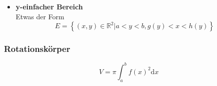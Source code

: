 \documentclass[8pt, a4paper, landscape, fleqn]{scrartcl}
\newenvironment {annotation}[1]
				{\begin{itshape} \begin{small} \textbf{#1} \begin{itemize}}
				{\end{itemize} \end{small} \end{itshape}}
\begin{document}
\begin{multicols*}{3}
\begin{itemize}
						\item \textbf{y-einfacher Bereich}
						\vspace{6pt}\\
						\vspace{-6pt}
						Etwas der Form
					    \[E=\left\{(x, y)\in \mathbb{R}^2 \left \vert    a < y < b, g(y) < x < h(y) \right. \right\}\]
					\end{itemize}
				    
				    
				\subsubsection{Rotationskörper}
					\begin{equation*}
						V=\pi \int_{a}^{b}f(x)^2\text{d}x
					\end{equation*}
					

\end{multicols*}
\end{document}
